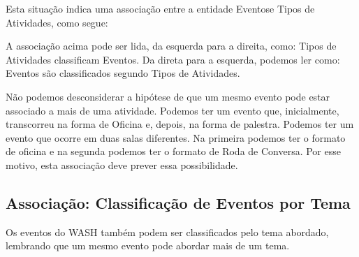 \documentclass[
12pt,		%
openright,	%
twoside,  %
a4paper,			%
chapter=TITLE,		%
english,			%
french,				%
spanish,			%
brazil				%
]{USPSC-classe/USPSC}
\begin{document}
Esta situa\c{c}\~ao indica uma associa\c{c}\~ao entre a entidade \textquotedbl Eventos\textquotedbl  e \textquotedbl Tipos de Atividades\textquotedbl , como segue:
















A associa\c{c}\~ao acima pode ser lida, da esquerda para a direita, como: \textquotedbl Tipos de Atividades classificam Eventos\textquotedbl . Da direta para a esquerda, podemos ler como: \textquotedbl Eventos s\~ao classificados segundo Tipos de Atividades\textquotedbl .














N\~ao podemos desconsiderar a hip\'otese de que um mesmo evento pode estar associado a mais de uma atividade. Podemos ter um evento que, inicialmente, transcorreu na forma de Oficina e, depois, na forma de palestra. Podemos ter um evento que ocorre em duas salas diferentes. Na primeira podemos ter o formato de oficina e na segunda podemos ter o formato de Roda de Conversa. Por esse motivo, esta associa\c{c}\~ao deve prever essa possibilidade.














\subsection[Associa\c{c}\~ao: Classifica\c{c}\~ao de Eventos por Tema]{Associa\c{c}\~ao: Classifica\c{c}\~ao de Eventos por Tema}\label{Associa\c{c}\~ao: Classifica\c{c}\~ao de Eventos por Tema}
Os eventos do WASH tamb\'em podem ser classificados pelo tema abordado, lembrando que um mesmo evento pode abordar mais de um tema.
\end{document}

